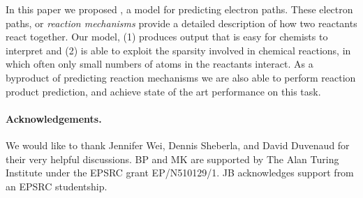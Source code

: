 
In this paper we proposed \ourModel, a model for predicting electron paths.
These electron paths, or {\em reaction mechanisms} provide a detailed description of how two reactants react together. 
Our model, (1) produces output that is easy for chemists to interpret and (2) is able to exploit the sparsity involved in chemical reactions, in which often only small numbers of atoms in the reactants interact.
As a byproduct of predicting reaction mechanisms we are also able to perform reaction product prediction,
 and achieve state of the art performance on this task.

 \paragraph{Acknowledgements.}




We would like to thank Jennifer Wei, Dennis Sheberla, and David Duvenaud for their very helpful discussions.
BP and MK are supported by The Alan Turing Institute under the EPSRC grant EP/N510129/1. 
JB acknowledges support from an EPSRC studentship.

